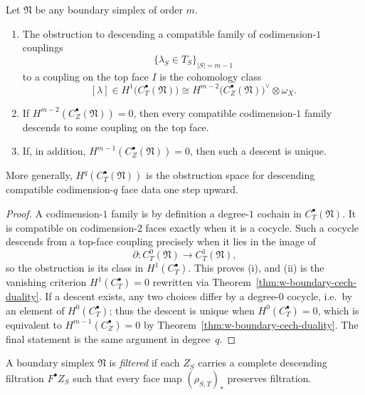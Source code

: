 \begin{theorem}
\label{thm:w-higher-mayer-vietoris-couplings}
Let $\mathfrak N$ be any boundary simplex of order $m$.
\begin{enumerate}[label=(\roman*)]
\item The obstruction to descending a compatible family of codimension-$1$ couplings
\[
\{\lambda_S\in T_S\}_{|S|=m-1}
\]
to a coupling on the top face $I$ is the cohomology class
\[
[\lambda]\in H^1\bigl(C_T^\bullet(\mathfrak N)\bigr)
\cong
H^{m-2}\bigl(C_Z^\bullet(\mathfrak N)\bigr)^\vee\otimes \omega_X.
\]
\item If $H^{m-2}(C_Z^\bullet(\mathfrak N))=0$, then every compatible codimension-$1$ family descends to
some coupling on the top face.
\item If, in addition, $H^{m-1}(C_Z^\bullet(\mathfrak N))=0$, then such a descent is unique.
\end{enumerate}
More generally, $H^q(C_T^\bullet(\mathfrak N))$ is the obstruction space for descending compatible
codimension-$q$ face data one step upward.
\end{theorem}

\begin{proof}
A codimension-$1$ family is by definition a degree-$1$ cochain in $C_T^\bullet(\mathfrak N)$. It is
compatible on codimension-$2$ faces exactly when it is a cocycle. Such a cocycle descends from a top-face
coupling precisely when it lies in the image of
\[
\partial\colon C_T^0(\mathfrak N)\to C_T^1(\mathfrak N),
\]
so the obstruction is its class in $H^1(C_T^\bullet)$. This proves (i), and (ii) is the vanishing criterion
$H^1(C_T^\bullet)=0$ rewritten via Theorem~\ref{thm:w-boundary-cech-duality}. If a descent exists, any two
choices differ by a degree-$0$ cocycle, i.e.\ by an element of $H^0(C_T^\bullet)$; thus the descent is unique
when $H^0(C_T^\bullet)=0$, which is equivalent to $H^{m-1}(C_Z^\bullet)=0$ by Theorem~\ref{thm:w-boundary-cech-duality}.
The final statement is the same argument in degree~$q$.
\end{proof}

\begin{definition}
\label{def:w-filtered-boundary-simplex}
A boundary simplex $\mathfrak N$ is \emph{filtered} if each $Z_S$ carries a complete descending filtration
$F^\bullet Z_S$ such that every face map $(\rho_{S,T})_*$ preserves filtration.
\end{definition}

